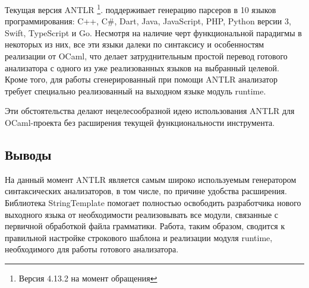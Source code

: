 Текущая версия ANTLR%
\footnote{Версия 4.13.2 на момент обращения }. поддерживает генерацию парсеров в 10 языков программирования: C++, C\#, Dart, Java, JavaScript, PHP, Python версии 3, Swift, TypeScript и Go. 
Несмотря на наличие черт функциональной парадигмы в некоторых из них, все эти языки далеки по синтаксису и особенностям реализации от OCaml, что делает затруднительным простой перевод готового анализатора с одного из уже реализованных языков на выбранный целевой. 
Кроме того, для работы сгенерированный при помощи ANTLR анализатор требует специально реализованный на выходном языке модуль runtime. 

Эти обстоятельства делают нецелесообразной идею использования ANTLR для OCaml-проекта без расширения текущей функциональности инструмента.

\subsection{Выводы}

На данный момент ANTLR является самым широко используемым генератором синтаксических анализаторов, в том числе, по причине удобства расширения. 
Библиотека StringTemplate помогает полностью освободить разработчика нового выходного языка от необходимости реализовывать все модули, связанные с первичной обработкой файла грамматики. 
Работа, таким образом, сводится к правильной настройке строкового шаблона и реализации модуля runtime, необходимого для работы готового анализатора.
